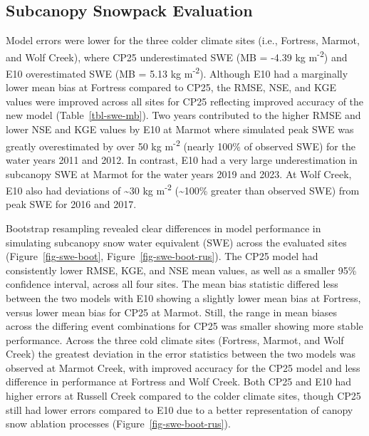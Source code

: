 \documentclass[
  letterpaper,
]{tex/uofsthesis-cs}
\begin{document}
\subsection{Subcanopy Snowpack
Evaluation}\label{subcanopy-snowpack-evaluation}

Model errors were lower for the three colder climate sites (i.e.,
Fortress, Marmot, and Wolf Creek), where CP25 underestimated SWE (MB =
-4.39 kg m\textsuperscript{-2}) and E10 overestimated SWE (MB = 5.13 kg
m\textsuperscript{-2}). Although E10 had a marginally lower mean bias at
Fortress compared to CP25, the RMSE, NSE, and KGE values were improved
across all sites for CP25 reflecting improved accuracy of the new model
(Table~\ref{tbl-swe-mb}). Two years contributed to the higher RMSE and
lower NSE and KGE values by E10 at Marmot where simulated peak SWE was
greatly overestimated by over 50 kg m\textsuperscript{-2} (nearly 100\%
of observed SWE) for the water years 2011 and 2012. In contrast, E10 had
a very large underestimation in subcanopy SWE at Marmot for the water
years 2019 and 2023. At Wolf Creek, E10 also had deviations of
\textasciitilde30 kg m\textsuperscript{-2} (\textasciitilde100\% greater
than observed SWE) from peak SWE for 2016 and 2017.

Bootstrap resampling revealed clear differences in model performance in
simulating subcanopy snow water equivalent (SWE) across the evaluated
sites (Figure~\ref{fig-swe-boot}, Figure~\ref{fig-swe-boot-rus}). The
CP25 model had consistently lower RMSE, KGE, and NSE mean values, as
well as a smaller 95\% confidence interval, across all four sites. The
mean bias statistic differed less between the two models with E10
showing a slightly lower mean bias at Fortress, versus lower mean bias
for CP25 at Marmot. Still, the range in mean biases across the differing
event combinations for CP25 was smaller showing more stable performance.
Across the three cold climate sites (Fortress, Marmot, and Wolf Creek)
the greatest deviation in the error statistics between the two models
was observed at Marmot Creek, with improved accuracy for the CP25 model
and less difference in performance at Fortress and Wolf Creek. Both CP25
and E10 had higher errors at Russell Creek compared to the colder
climate sites, though CP25 still had lower errors compared to E10 due to
a better representation of canopy snow ablation processes
(Figure~\ref{fig-swe-boot-rus}).
\end{document}
